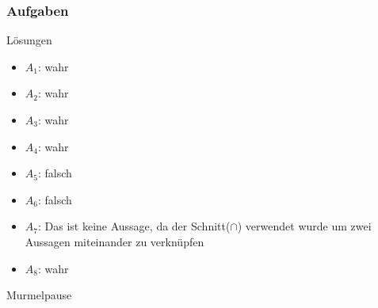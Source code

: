 \subsubsection{Aufgaben}
{
\begin{frame}{Lösungen}
  \begin{itemize}[<+- | alert@+>]
        \item 
            $A_1$: wahr
        \item
            $A_2$: wahr
        \item
            $A_3$: wahr
        \item
            $A_4$: wahr 
        \item
            $A_5$: falsch
       	\item
       		$A_6$: falsch
        \item
            $A_7$: Das ist keine Aussage, da der Schnitt($\cap$) verwendet wurde um zwei Aussagen miteinander zu verknüpfen
       	\item
       		$A_8$: wahr
    \end{itemize}
\end{frame}
}

\begin{frame}[standout]
    Murmelpause
\end{frame}






